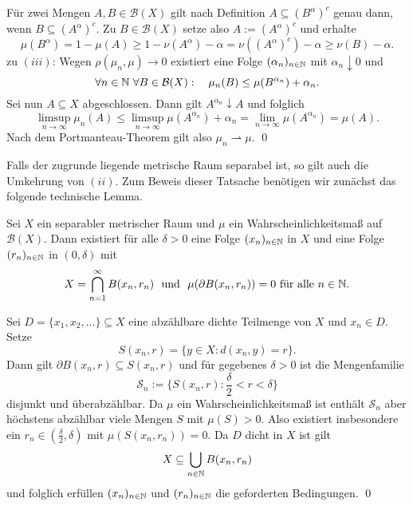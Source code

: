\begin{proof*}
    Für zwei Mengen $A,B \in \mathcal{B}(X)$ gilt nach Definition $A \subseteq (B^{\alpha})^c$ genau dann, wenn $B \subseteq (A^{\alpha})^c$. 
    Zu $B \in \mathcal{B}(X)$ setze also $A:=(A^{\alpha})^c$ und erhalte 
    $$ 
        \mu(B^{\alpha}) = 1 - \mu(A) \geq 1 - \nu(A^{\alpha}) - \alpha = \nu((A^{\alpha})^c) - \alpha \geq \nu(B) - \alpha. 
    $$
    zu $(iii)$: Wegen $\rho(\mu_n, \mu) \to 0$ existiert eine Folge $(\alpha_n)_{n \in \mathbb{N}}$ mit $\alpha_n \downarrow 0$ und 
    $$
        \forall n \in \mathbb{N} \ \forall B \in \mathcal{B}(X): \quad \mu_n(B) \leq \mu(B^{\alpha_n}) + \alpha_n. 
    $$
    Sei nun $A \subseteq X$ abgeschlossen. Dann gilt $A^{\alpha_n} \downarrow A$ und folglich
    $$
        \limsup_{n \to \infty} \mu_n(A) \leq \limsup_{n \to \infty} \mu(A^{\alpha_n}) + \alpha_n = \lim_{n \to \infty} \mu(A^{\alpha_n}) = \mu(A). 
    $$
    Nach dem Portmanteau-Theorem gilt also $\mu_n \rightharpoonup \mu$. 
    \qed
\end{proof*}
Falls der zugrunde liegende metrische Raum separabel ist, so gilt auch die Umkehrung von $(ii)$. Zum Beweis dieser Tatsache benötigen wir zunächst das folgende technische Lemma. 
\begin{lemma}
    Sei $X$ ein separabler metrischer Raum und $\mu$ ein Wahrscheinlichkeitsmaß auf $\mathcal{B}(X)$. Dann existiert für alle $\delta > 0$ eine Folge $(x_n)_{n \in \mathbb{N}}$ in $X$ und eine Folge $(r_n)_{n \in \mathbb{N}}$ in $(0, \delta)$ mit 
         $$
         X = \bigcap_{n=1}^{\infty}B(x_n, r_n) \ \text{ und } \ \mu(\partial B(x_n, r_n)) = 0 \text{ für alle }n \in \N.
         $$  
\end{lemma}
\begin{proof*}%
    Sei $D = \{x_1, x_2,... \} \subseteq X$ eine abzählbare dichte Teilmenge von $X$ und $x_n \in D$. Setze 
    $$
        S(x_n,r) = \{y \in X: d(x_n,y) = r\}.
    $$
    Dann gilt $\partial B(x_n,r) \subseteq S(x_n,r)$ und für gegebenes $\delta > 0$ ist die Mengenfamilie
    $$
        \mathcal{S}_n := \{S(x_n,r) : \frac{\delta}{2} < r < \delta \}
    $$
    disjunkt und überabzählbar. Da $\mu$ ein Wahrscheinlichkeitsmaß ist enthält $\mathcal{S}_n$ aber höchstens abzählbar viele Mengen $S$ mit $\mu(S) > 0$. 
    Also existiert insbesondere ein $r_n \in (\frac{\delta}{2}, \delta)$ mit $\mu(S(x_n,r_n)) = 0$. Da $D$ dicht in $X$ ist gilt 
    $$
        X \subseteq \bigcup_{n \in  \mathbb{N}}B(x_n, r_n)
    $$
    und folglich erfüllen $(x_n)_{n \in \mathbb{N}}$ und $(r_n)_{n \in \mathbb{N}}$ die geforderten Bedingungen. \qed
\end{proof*}


